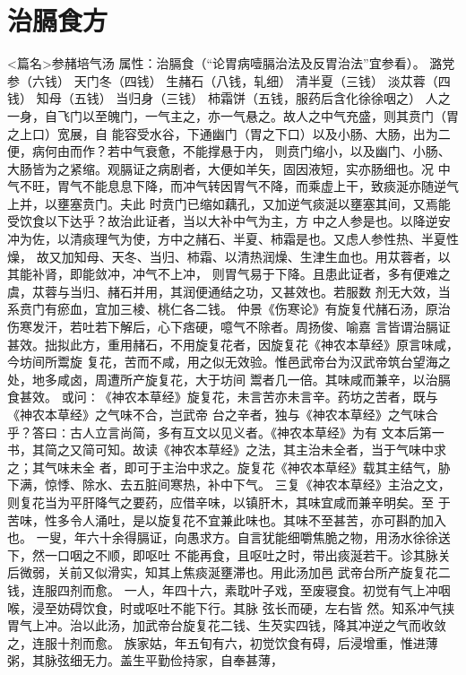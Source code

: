 \documentclass[a4paper,12pt,UTF8,twoside]{ctexbook}
\begin{document}
\chapter{治膈食方}
<篇名>参赭培气汤
属性：治膈食（“论胃病噎膈治法及反胃治法”宜参看）。 
潞党参（六钱） 天门冬（四钱） 生赭石（八钱，轧细） 清半夏（三钱） 淡苁蓉（四钱） 知母（五钱） 
当归身（三钱） 柿霜饼（五钱，服药后含化徐徐咽之） 
人之一身，自飞门以至魄门，一气主之，亦一气悬之。故人之中气充盛，则其贲门（胃之上口）宽展，自 
能容受水谷，下通幽门（胃之下口）以及小肠、大肠，出为二便，病何由而作？若中气衰惫，不能撑悬于内， 
则贲门缩小，以及幽门、小肠、大肠皆为之紧缩。观膈证之病剧者，大便如羊矢，固因液短，实亦肠细也。况 
中气不旺，胃气不能息息下降，而冲气转因胃气不降，而乘虚上干，致痰涎亦随逆气上并，以壅塞贲门。夫此 
时贲门已缩如藕孔，又加逆气痰涎以壅塞其间，又焉能受饮食以下达乎？故治此证者，当以大补中气为主，方 
中之人参是也。以降逆安冲为佐，以清痰理气为使，方中之赭石、半夏、柿霜是也。又虑人参性热、半夏性燥， 
故又加知母、天冬、当归、柿霜、以清热润燥、生津生血也。用苁蓉者，以其能补肾，即能敛冲，冲气不上冲， 
则胃气易于下降。且患此证者，多有便难之虞，苁蓉与当归、赭石并用，其润便通结之功，又甚效也。若服数 
剂无大效，当系贲门有瘀血，宜加三棱、桃仁各二钱。 
仲景《伤寒论》有旋复代赭石汤，原治伤寒发汗，若吐若下解后，心下痞硬，噫气不除者。周扬俊、喻嘉 
言皆谓治膈证甚效。拙拟此方，重用赭石，不用旋复花者，因旋复花《神农本草经》原言味咸，今坊间所鬻旋 
复花，苦而不咸，用之似无效验。惟邑武帝台为汉武帝筑台望海之处，地多咸卤，周遭所产旋复花，大于坊间 
鬻者几一倍。其味咸而兼辛，以治膈食甚效。 
或问∶《神农本草经》旋复花，未言苦亦未言辛。药坊之苦者，既与《神农本草经》之气味不合，岂武帝 
台之辛者，独与《神农本草经》之气味合乎？答曰∶古人立言尚简，多有互文以见义者。《神农本草经》为有 
文本后第一书，其简之又简可知。故读《神农本草经》之法，其主治未全者，当于气味中求之；其气味未全 
者，即可于主治中求之。旋复花《神农本草经》载其主结气，胁下满，惊悸、除水、去五脏间寒热，补中下气。 
三复《神农本草经》主治之文，则复花当为平肝降气之要药，应借辛味，以镇肝木，其味宜咸而兼辛明矣。至 
于苦味，性多令人涌吐，是以旋复花不宜兼此味也。其味不至甚苦，亦可斟酌加入也。 
一叟，年六十余得膈证，向愚求方。自言犹能细嚼焦脆之物，用汤水徐徐送下，然一口咽之不顺，即呕吐 
不能再食，且呕吐之时，带出痰涎若干。诊其脉关后微弱，关前又似滑实，知其上焦痰涎壅滞也。用此汤加邑 
武帝台所产旋复花二钱，连服四剂而愈。 
一人，年四十六，素耽叶子戏，至废寝食。初觉有气上冲咽喉，浸至妨碍饮食，时或呕吐不能下行。其脉 
弦长而硬，左右皆 
然。知系冲气挟胃气上冲。治以此汤，加武帝台旋复花二钱、生芡实四钱，降其冲逆之气而收敛之，连服十剂而愈。 
族家姑，年五旬有六，初觉饮食有碍，后浸增重，惟进薄粥，其脉弦细无力。盖生平勤俭持家，自奉甚薄， 
\end{document}
